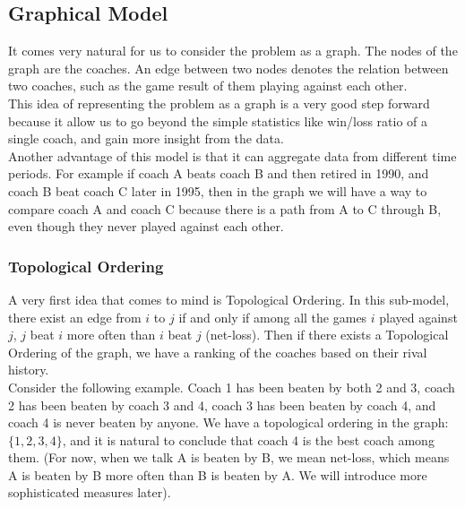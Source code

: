 \documentclass[titlepage]{article}
\begin{document}
\subsection{Graphical Model}
It comes very natural for us to consider the problem as a graph. The nodes of the graph are the coaches. An edge between two nodes denotes the relation between two coaches, such as the game result of them playing against each other.
\\

\noindent This idea of representing the problem as a graph is a very good step forward because it allow us to go beyond the simple statistics like win/loss ratio of a single coach, and gain more insight from the data.
\\

\noindent Another advantage of this model is that it can aggregate data from different time periods. For example if coach A beats coach B and then retired in 1990, and coach B beat coach C later in 1995, then in the graph we will have a way to compare coach A and coach C because there is a path from A to C through B, even though they never played against each other.

\subsubsection{Topological Ordering}
A very first idea that comes to mind is Topological Ordering. In this sub-model, there exist an edge from $i$ to $j$ if and only if among all the games $i$ played against $j$, $j$ beat $i$ more often than $i$ beat $j$ (net-loss). Then if there exists a Topological Ordering of the graph, we have a ranking of the coaches based on their rival history.
\\

\noindent Consider the following example. Coach 1 has been beaten by both 2 and 3, coach 2 has been beaten by coach 3 and 4, coach 3 has been beaten by coach 4, and coach 4 is never beaten by anyone. We have a topological ordering in the graph: $\{1, 2, 3, 4\}$, and it is natural to conclude that coach 4 is the best coach among them. (For now, when we talk A is beaten by B, we mean net-loss, which means A is beaten by B more often than B is beaten by A. We will introduce more sophisticated measures later).
\end{document}

